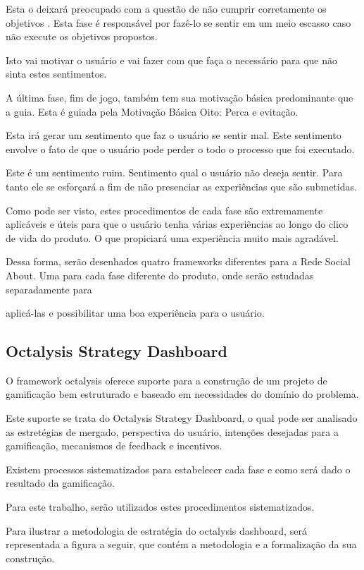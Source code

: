 Esta o deixará preocupado com a questão de não cumprir corretamente os objetivos
.
Esta fase é responsável por fazê-lo se sentir em um meio escasso caso não execute
os objetivos propostos.

Isto vai motivar o usuário e vai fazer com que faça o necessário para que não
sinta estes sentimentos.

A última fase, fim de jogo, também tem sua motivação básica predominante que
a guia. Esta é guiada pela Motivação Básica Oito: Perca e evitação.

Esta irá gerar um sentimento que faz o usuário se sentir mal. Este sentimento
envolve o fato de que o usuário pode perder o todo o processo que foi executado.



Este é um sentimento ruim. Sentimento qual o usuário não deseja sentir. Para tanto
ele se esforçará a fim de não presenciar as experiências que são submetidas.

Como pode ser visto, estes procedimentos de cada fase são extremamente aplicáveis
e úteis para que o usuário tenha várias experiências ao longo do clico de vida do
produto. O que propiciará uma experiência muito mais agradável.

Dessa forma, serão desenhados quatro frameworks diferentes para a Rede Social About.
Uma para cada fase diferente do produto, onde serão estudadas separadamente para

aplicá-las e possibilitar uma boa experiência para o usuário.

\subsection{Octalysis Strategy Dashboard}
\label{sec:octalysisdashborad}
O framework octalysis oferece suporte para a construção de um projeto de gamificação
bem estruturado e baseado em necessidades do domínio do problema.

Este suporte se trata do Octalysis Strategy Dashboard, o qual pode ser analisado
 as
estretégias de mergado, perspectiva do usuário, intenções desejadas para a gamificação,
mecanismos de feedback e incentivos.

Existem processos sistematizados para estabelecer cada fase e como será dado o
resultado da gamificação.

Para este trabalho, serão utilizados estes procedimentos sistematizados.

Para ilustrar a metodologia de estratégia do octalysis dashboard, será representada
a figura a seguir, que contém a metodologia e a formalização da sua construção.

